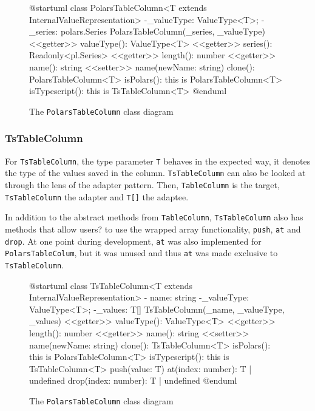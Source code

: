 \begin{figure}
	\begin{plantuml}
		@startuml
		class PolarsTableColumn<T extends InternalValueRepresentation> {
				-_valueType: ValueType<T>;
				-_series: polars.Series
				PolarsTableColumn(_series, _valueType)
				<<getter>> valueType(): ValueType<T>
				<<getter>> series(): Readonly<pl.Series>
				<<getter>> length(): number
				<<getter>> name(): string
				<<setter>> name(newName: string)
				clone(): PolarsTableColumn<T>
				isPolars(): this is PolarsTableColumn<T>
				isTypescript(): this is TsTableColumn<T>
			}
		@enduml
	\end{plantuml}
	\caption{The \Verb|PolarsTableColumn| class diagram}
	\label{fig:uml:polarstablecolumn}
\end{figure}

\subsubsection{TsTableColumn}
For \Verb|TsTableColumn|, the type parameter \Verb|T| behaves in the expected way, it denotes the type of the values saved in the column.
\Verb|TsTableColumn| can also be looked at through the lens of the adapter pattern.
Then, \Verb|TableColumn| is the target, \Verb|TsTableColumn| the adapter and \Verb|T[]| the adaptee.

In addition to the abstract methods from \Verb|TableColumn|, \Verb|TsTableColumn| also has methods that allow users? %
to use the wrapped array functionality, \Verb|push|, \Verb|at| and \Verb|drop|.
At one point during development, \Verb|at| was also implemented for \Verb|PolarsTableColum|, but it was unused and thus \Verb|at| was made exclusive to \Verb|TsTableColumn|.

\begin{figure}
	\begin{plantuml}
		@startuml
		class TsTableColumn<T extends InternalValueRepresentation> {
				- name: string
				-_valueType: ValueType<T>;
				-_values: T[]
				TsTableColumn(_name, _valueType, _values)
				<<getter>> valueType(): ValueType<T>
				<<getter>> length(): number
				<<getter>> name(): string
				<<setter>> name(newName: string)
				clone(): TsTableColumn<T>
				isPolars(): this is PolarsTableColumn<T>
				isTypescript(): this is TsTableColumn<T>
				push(value: T)
				at(index: number): T | undefined
				drop(index: number): T | undefined
			}
		@enduml
	\end{plantuml}
	\caption{The \Verb|PolarsTableColumn| class diagram}
	\label{fig:uml:tstablecolumn}
\end{figure}

